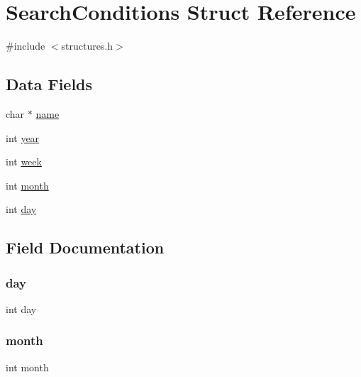 \hypertarget{struct_search_conditions}{}\section{Search\+Conditions Struct Reference}
\label{struct_search_conditions}


{\ttfamily \#include $<$structures.\+h$>$}

\subsection*{Data Fields}
\begin{DoxyCompactItemize}
\item 
char $\ast$ \hyperlink{struct_search_conditions_a5ac083a645d964373f022d03df4849c8}{name}
\item 
int \hyperlink{struct_search_conditions_abeac221e38b7b9ce7df8722c842bf671}{year}
\item 
int \hyperlink{struct_search_conditions_a3560bdec25d509ef8f4f02409eaa9f1d}{week}
\item 
int \hyperlink{struct_search_conditions_aedb06abe5aff12fa3e7e0e71a374edfb}{month}
\item 
int \hyperlink{struct_search_conditions_a4c11afc03fc3ee49bab660def6558f2a}{day}
\end{DoxyCompactItemize}


\subsection{Field Documentation}
\mbox{\label{struct_search_conditions_a4c11afc03fc3ee49bab660def6558f2a}} 
\subsubsection{\texorpdfstring{day}{day}}
{\footnotesize\ttfamily int day}

\mbox{\label{struct_search_conditions_aedb06abe5aff12fa3e7e0e71a374edfb}} 
\subsubsection{\texorpdfstring{month}{month}}
{\footnotesize\ttfamily int month}

